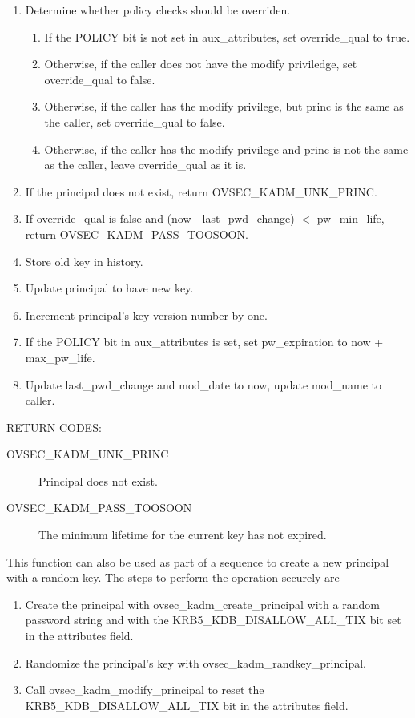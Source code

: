 \begin{enumerate}
\item Determine whether policy checks should be overriden.
\begin{enumerate}
\item If the POLICY bit is not set in aux_attributes, set
override_qual to true.
\item Otherwise, if the caller does not have the modify priviledge,
set override_qual to false.
\item Otherwise, if the caller has the modify privilege, but princ is the
same as the caller, set override_qual to false.
\item Otherwise, if the caller has the modify privilege and princ is
not the same as the caller, leave override_qual as it is.
\end{enumerate}
\item If the principal does not exist, return OVSEC_KADM_UNK_PRINC.
\item If override_qual is false and (now - last_pwd_change) $<$
pw_min_life, return OVSEC_KADM_PASS_TOOSOON.
\item Store old key in history.
\item Update principal to have new key.
\item Increment principal's key version number by one.
\item If the POLICY bit in aux_attributes is set, set pw_expiration to
now + max_pw_life.
\item Update last_pwd_change and mod_date to now, update mod_name to
caller.
\end{enumerate}

RETURN CODES:

\begin{description}
\item[OVSEC_KADM_UNK_PRINC] Principal does not exist.
\item[OVSEC_KADM_PASS_TOOSOON] The minimum lifetime for the current
key has not expired.
\end{description}

This function can also be used as part of a sequence to create a new
principal with a random key.  The steps to perform the operation
securely are

\begin{enumerate}
\item Create the principal with ovsec_kadm_create_principal with a
random password string and with the KRB5_KDB_DISALLOW_ALL_TIX bit set
in the attributes field.

\item Randomize the principal's key with ovsec_kadm_randkey_principal.

\item Call ovsec_kadm_modify_principal to reset the
KRB5_KDB_DISALLOW_ALL_TIX bit in the attributes field.
\end{enumerate}

